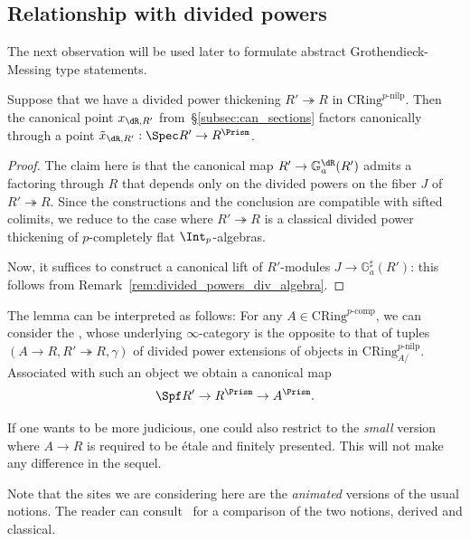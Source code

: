 \documentclass[10pt]{amsart}
\begin{document}
\subsection{Relationship with divided powers}
\label{subsec:divided_powers_lifting}

The next observation will be used later to formulate abstract Grothendieck-Messing type statements.

\begin{lemma}
\label{lem:lift_divided_powers}
Suppose that we have a divided power thickening $R'\twoheadrightarrow R$ in $\mathrm{CRing}^{p\text{-nilp}}$. Then the canonical point $x_{\dR,R'}$ from~\S\ref{subsec:can_sections} factors canonically through a point $\tilde{x}_{\dR,R'}:\Spec R'\to R^{\Prism}$.
\end{lemma}
\begin{proof}
The claim here is that the canonical map $R'\to \mathbb{G}^{\dR}_a(R')$ admits a factoring through $R$ that depends only on the divided powers on the fiber $J$ of $R'\twoheadrightarrow R$. Since the constructions and the conclusion are compatible with sifted colimits, we reduce to the case where $R'\twoheadrightarrow R$ is a classical divided power thickening of $p$-completely flat $\Int_p$-algebras.

Now, it suffices to construct a canonical lift of $R'$-modules $J\to \mathbb{G}_a^\sharp(R')$: this follows from Remark~\ref{rem:divided_powers_div_algebra}.
\end{proof}

\begin{remark}
\label{rem:crystalline_site}
The lemma can be interpreted as follows: For any $A\in \mathrm{CRing}^{p\text{-comp}}$, we can consider the , whose underlying $\infty$-category is the opposite to that of tuples $(A\to R,R'\twoheadrightarrow R,\gamma)$ of divided power extensions of objects in $\mathrm{CRing}^{p\text{-nilp}}_{A/}$. Associated with such an object we obtain a canonical map
\[
\Spf R'\to R^{\Prism}\to A^{\Prism}.
\]

If one wants to be more judicious, one could also restrict to the \emph{small} version where $A\to R$ is required to be \'etale and finitely presented. This will not make any difference in the sequel.

Note that the sites we are considering here are the \emph{animated} versions of the usual notions. The reader can consult~\cite[\S 4]{Mao2021-jt} for a comparison of the two notions, derived and classical.
\end{remark}  
\end{document}
